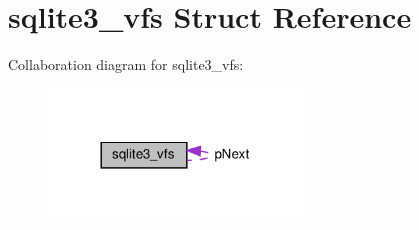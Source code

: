 \hypertarget{structsqlite3__vfs}{}\section{sqlite3\+\_\+vfs Struct Reference}
\label{structsqlite3__vfs}


Collaboration diagram for sqlite3\+\_\+vfs\+:
\nopagebreak
\begin{figure}[H]
\begin{center}
\leavevmode
\includegraphics[width=192pt]{structsqlite3__vfs__coll__graph}
\end{center}
\end{figure}
